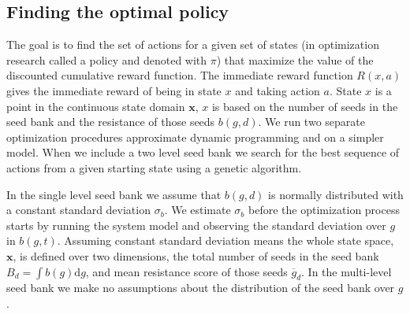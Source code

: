\documentclass[12pt, a4paper]{article}
\begin{document}
\subsection{Finding the optimal policy}
The goal is to find the set of actions for a given set of states (in optimization research called a policy and denoted with $\pi$) that maximize the value of the discounted cumulative reward function. The immediate reward function $R(x, a)$ gives the immediate reward of being in state $x$ and taking action $a$. State $x$ is a point in the continuous state domain $\mathbf{x}$, $x$ is based on the number of seeds in the seed bank and the resistance of those seeds $b(g, d)$. We run two separate optimization procedures approximate dynamic programming and on a simpler model. When we include a two level seed bank we search for the best sequence of actions from a given starting state using a genetic algorithm.       

In the single level seed bank we assume that $b(g, d)$ is normally distributed with a constant standard deviation $\sigma_b$. We estimate $\sigma_b$ before the optimization process starts by running the system model and observing the standard deviation over $g$ in $b(g, t)$. Assuming constant standard deviation means the whole state space, $\mathbf{x}$, is defined over two dimensions, the total number of seeds in the seed bank $B_d = \int b(g)\text{d}g$, and mean resistance score of those seeds $\overline{g}_d$. In the multi-level seed bank we make no assumptions about the distribution of the seed bank over $g$.   
\end{document}
